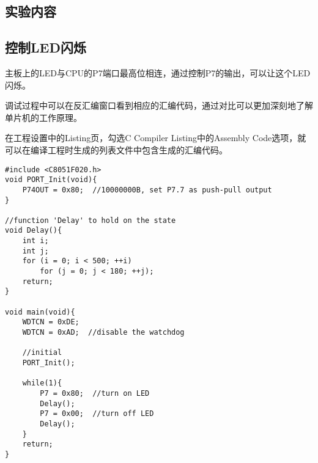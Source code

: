 \begin{spacing}{1.3}



\section{实验内容}

\subsection{控制LED闪烁}

主板上的LED与CPU的P7端口最高位相连，通过控制P7的输出，可以让这个LED闪烁。

调试过程中可以在反汇编窗口看到相应的汇编代码，通过对比可以更加深刻地了解单片机的工作原理。

在工程设置中的Listing页，勾选C Compiler Listing中的Assembly Code选项，就可以在编译工程时生成的列表文件中包含生成的汇编代码。

\begin{lstlisting}
#include <C8051F020.h>
void PORT_Init(void){
	P74OUT = 0x80;  //10000000B, set P7.7 as push-pull output
}

//function 'Delay' to hold on the state
void Delay(){
	int i;
	int j;
	for (i = 0; i < 500; ++i)
		for (j = 0; j < 180; ++j);
	return;
}

void main(void){
	WDTCN = 0xDE;
	WDTCN = 0xAD;  //disable the watchdog

	//initial
	PORT_Init();

	while(1){
		P7 = 0x80;  //turn on LED
		Delay();
		P7 = 0x00;  //turn off LED
		Delay();
	}
	return;
}
\end{lstlisting}



\end{spacing}

